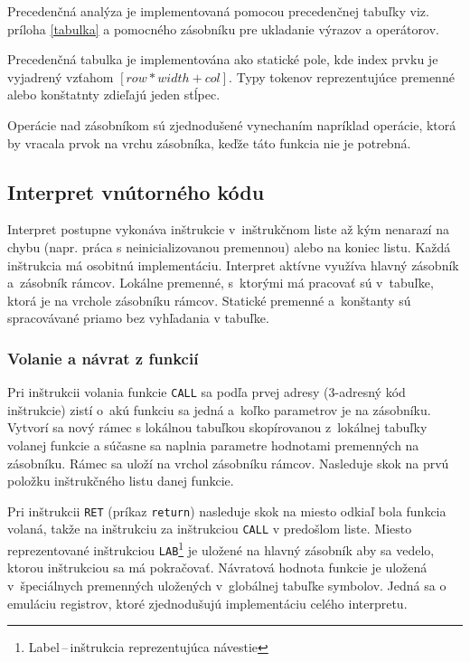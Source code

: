\documentclass[11pt,a4paper]{article}
\begin{document}
	Precedenčná analýza je implementovaná pomocou precedenčnej tabuľky viz.
	príloha \ref{tabulka} a pomocného zásobníku pre ukladanie výrazov a operátorov.
	
	Precedenčná tabulka je implementována ako statické pole, kde index prvku je vyjadrený vzťahom $[row * width + col]$.
	Typy tokenov reprezentujúce premenné alebo konštatnty zdieľajú jeden stĺpec.
	
	Operácie nad zásobníkom sú zjednodušené vynechaním napríklad operácie, ktorá by
	vracala prvok na vrchu zásobníka, keďže táto funkcia nie je potrebná.
	
	\subsection{Interpret vnútorného kódu}
	\label{interpret}
	Interpret postupne vykonáva inštrukcie v~inštrukčnom liste až kým nenarazí
	na chybu (napr. práca s neinicializovanou premennou) alebo na koniec listu.
	Každá inštrukcia má osobitnú implementáciu. Interpret aktívne využíva hlavný
	zásobník a~zásobník rámcov. Lokálne premenné, s~ktorými má pracovať  sú v~tabuľke,
	ktorá je na vrchole zásobníku rámcov. Statické premenné a~konštanty sú spracovávané
	priamo bez vyhľadania v tabuľke.
	
	\subsubsection{Volanie a návrat z funkcií}
	\label{funkcia}
	Pri inštrukcii volania funkcie \texttt{CALL} sa podľa prvej adresy
	(3-adresný kód inštrukcie) zistí o~akú funkciu sa jedná a~koľko parametrov
	je na zásobníku. Vytvorí sa nový rámec s lokálnou tabuľkou skopírovanou
	z~lokálnej tabuľky volanej funkcie a súčasne sa naplnia parametre
	hodnotami premenných na zásobníku. Rámec sa uloží na vrchol zásobníku rámcov.
	Nasleduje skok na prvú položku inštrukčného listu danej funkcie.
	
	
	Pri inštrukcii \texttt{RET} (príkaz \texttt{return}) nasleduje skok na
	miesto odkiaľ bola funkcia volaná, takže na inštrukciu za inštrukciou
	\texttt{CALL} v predošlom liste. Miesto reprezentované inštrukciou
	\texttt{LAB}\footnote{Label\,--\,inštrukcia reprezentujúca návestie}
	je uložené na hlavný zásobník aby sa vedelo, ktorou inštrukciou
	sa má pokračovať. Návratová hodnota funkcie je uložená v~špeciálnych
	premenných uložených v~globálnej tabuľke symbolov. Jedná sa o emuláciu
	registrov, ktoré zjednodušujú implementáciu celého interpretu.
	
\end{document}
